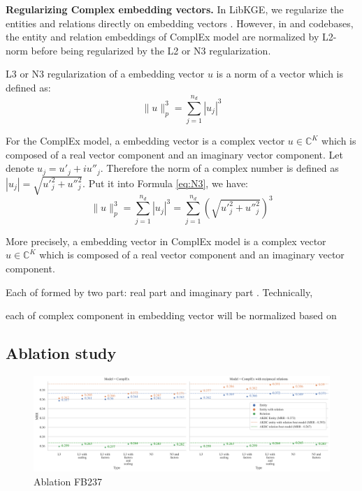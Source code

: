 \noindent\textbf{Regularizing Complex embedding vectors.} In LibKGE, we regularize the entities and relations directly on embedding vectors \citep{Ruffinelli2020You}. However, in \citet{chen2021relation} and \citet{lacroix2018canonical} codebases, the entity and relation embeddings of ComplEx model are normalized by L2-norm before being regularized by the L2 or N3 regularization. 

L3 or N3 regularization of a embedding vector $u$ is a norm of a vector which is defined as:
\begin{equation}
    \label{eq:N3}
    \|u \|^3_p = \sum_{j=1}^{n_d}|u_j|^3
\end{equation} 

For the ComplEx model, a embedding vector is a complex vector $u \in \mathbb{C}^K$ which is composed of a real vector component and an imaginary vector component. Let denote $u_j = u'_j + iu''_j$. Therefore the norm of a complex number is defined as $|u_j| = \sqrt{{u'}_j^2 + {u''}_j^2}$. Put it into Formula \ref{eq:N3}, we have:
\begin{equation}
    \label{eq:final}
    \|u \|^3_p = \sum_{j=1}^{n_d}|u_j|^3 = \sum_{j=1}^{n_d}\left(\sqrt{{u'}_j^2 + {u''}_j^2}\right)^3
\end{equation} 


More precisely, a embedding vector in ComplEx model is a complex vector $u \in \mathbb{C}^K$ which is composed of a real vector component and an imaginary vector component. 

Each of  formed by two part: real part and imaginary part \citet{trouillon2016complex}. Technically, 

each of complex component in embedding vector will be normalized based on 
\newline

\subsection{Ablation study}


\begin{figure}[!htbp]
	\begin{center}
	\includegraphics[width=\linewidth]{Images/Ablation_FB237.png}
	\caption[Ablation FB237]{Ablation FB237}
	\label{fig:Ablation FB237}
	\end{center}
\end{figure}

